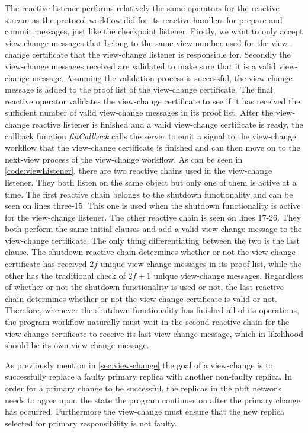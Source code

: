 The reactive listener performs relatively the same operators for the reactive stream as the protocol workflow did for its reactive handlers for prepare and commit messages, just like the checkpoint listener. Firstly, we want to only accept view-change messages that belong to the same view number used for the view-change certificate that the view-change listener is responsible for. Secondly the view-change messages received are validated to make sure that it is a valid view-change message. Assuming the validation process is successful, the view-change message is added to the proof list of the view-change certificate. The final reactive operator validates the view-change certificate to see if it has received the sufficient number of valid view-change messages in its proof list. After the view-change reactive listener is finished and a valid view-change certificate is ready, the callback function \emph{finCallback} calls the server to emit a signal to the view-change workflow that the view-change certificate is finished and can then move on to the next-view process of the view-change workflow. As can be seen in \autoref{code:viewListener}, there are two reactive chains used in the view-change listener. They both listen on the same  object but only one of them is active at a time. The first reactive chain belongs to the shutdown functionality and can be seen on lines three-15. This one is used when the shutdown functionality is active for the view-change listener. The other reactive chain is seen on lines 17-26. They both perform the same initial  clauses and add a valid view-change message to the view-change certificate. The only thing differentiating between the two is the last  clause. The shutdown reactive chain determines whether or not the view-change certificate has received $2f$ unique view-change messages in its proof list, while the other has the traditional check of $2f+1$ unique view-change messages. Regardless of whether or not the shutdown functionality is used or not, the last reactive chain determines whether or not the view-change certificate is valid or not. Therefore, whenever the shutdown functionality has finished all of its operations, the program workflow naturally must wait in the second reactive chain for the view-change certificate to receive its last view-change message, which in likelihood should be its own view-change message. 
\fi

\iffalse
As previously mention in \autoref{sec:view-change} the goal of a view-change is to successfully replace a faulty primary replica with another non-faulty replica. In order for a primary change to be successful, the replicas in the \ac{pbft} network needs to agree upon the state the program continues on after the primary change has occurred. Furthermore the view-change must ensure that the new replica selected for primary responsibility is not faulty. 


